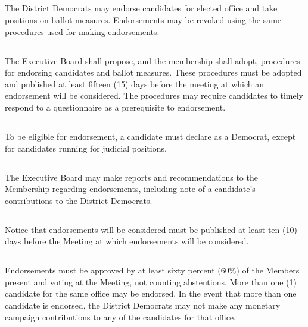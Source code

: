 \subsection{}
The \fortythird{} District Democrats may endorse candidates for elected office and take positions on ballot measures.  Endorsements may be revoked using the same procedures used for making endorsements.

\subsection{} \label{endorsement-procedures}
The Executive Board shall propose, and the membership shall adopt, procedures for endorsing candidates and ballot measures. These procedures must be adopted and published at least fifteen (15) days before the meeting at which an endorsement will be considered. The procedures may require candidates to timely respond to a questionnaire as a prerequisite to endorsement.

\subsection{}
To be eligible for endorsement, a candidate must declare as a Democrat, except for candidates running for judicial positions.

\subsection{}
The Executive Board may make reports and recommendations to the Membership regarding endorsements, including note of a candidate’s contributions to the \fortythird{} District Democrats.

\subsection{}
Notice that endorsements will be considered must be published at least ten (10) days before the Meeting at which endorsements will be considered.

\subsection{}
Endorsements must be approved by at least sixty percent (60\%) of the Members present and voting at the Meeting, not counting abstentions. More than one (1) candidate for the same office may be endorsed. In the event that more than one candidate is endorsed, the \fortythird{} District Democrats may not make any monetary campaign contributions to any of the candidates for that office.

